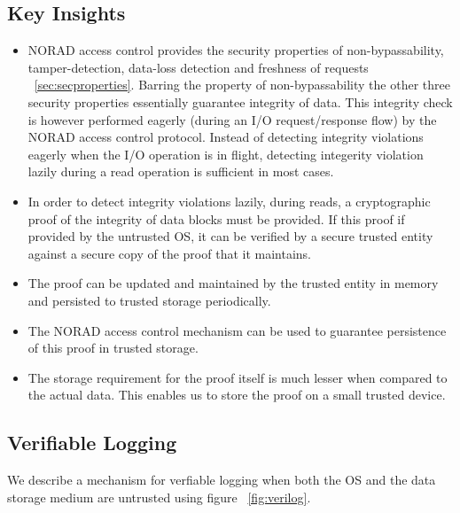 \documentclass[withindex,glossary]{cam-thesis}
\begin{document}
\subsection{Key Insights}

\begin{itemize}

\item NORAD access control provides the security properties of non-bypassability, tamper-detection, data-loss detection and freshness of requests ~\ref{sec:secproperties}.
Barring the property of non-bypassability the other three security properties essentially guarantee integrity of data.
This integrity check is however performed eagerly (during an I/O request/response flow) by the NORAD access control protocol.
Instead of detecting integrity violations eagerly when the I/O operation is in flight, detecting integerity violation lazily during a read operation is sufficient in most cases.

\item In order to detect integrity violations lazily, during reads, a cryptographic proof of the integrity of data blocks must be provided.
If this proof if provided by the untrusted OS, it can be verified by a secure trusted entity against a secure copy of the proof that it maintains.

\item The proof can be updated and maintained by the trusted entity in memory and persisted to trusted storage periodically.

\item The NORAD access control mechanism can be used to guarantee persistence of this proof in trusted storage.

\item The storage requirement for the proof itself is much lesser when compared to the actual data.
This enables us to store the proof on a small trusted device.

\end{itemize}

\subsection{Verifiable Logging}
We describe a mechanism for verfiable logging when both the OS and the data storage medium are untrusted using figure ~\ref{fig:verilog}.
\end{document}

